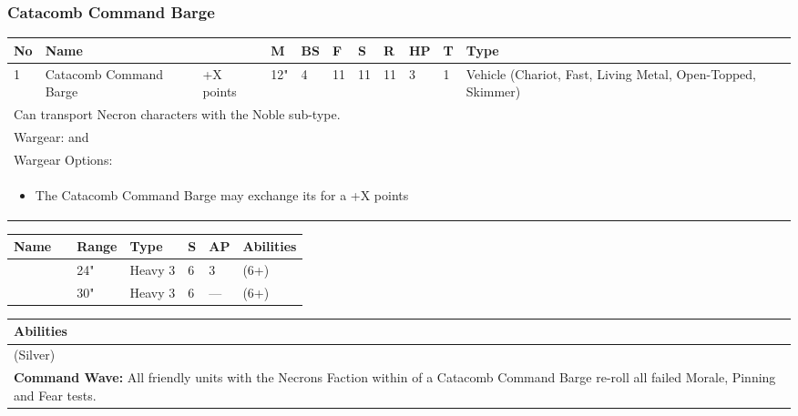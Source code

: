 \newpage
\subsubsection{Catacomb Command Barge}

\noindent
\begin{tabular}{||m{10pt} m{95pt} m{30pt} m{11pt} m{11pt} m{11pt} m{11pt} m{11pt} m{11pt} m{11pt} m{200pt}||}
	\hline
	No & Name & & M & BS & F & S & R & HP & T & Type \\
	\hline
	1 & Catacomb Command Barge & +X points & 12" & 4 & 11 & 11 & 11 & 3 & 1 & Vehicle (Chariot, Fast, Living Metal, Open-Topped, Skimmer) \\
	\hline
	\hline
	\multicolumn{11}{||Z{532 pt}||}{Can transport Necron characters with the Noble sub-type.}\\		
	\hline
	\hline
	\multicolumn{11}{||Z{532 pt}||}{Wargear: \quickref{Gauss Cannon} and \quickref{Quantum Shielding}} \\
	\multicolumn{11}{||Z{532 pt}||}{Wargear Options:} \\	
	\multicolumn{11}{||Z{532 pt}||}{\begin{itemize}
			\item The Catacomb Command Barge may exchange its \quickref{Gauss Cannon} for a \quickref{Tesla Cannon} \hrulefill +X points
	\end{itemize}} \\
	\hline
\end{tabular}

\noindent
\begin{tabular}{||m{110pt} m{30pt} m{31pt} m{55pt} m{12pt} m{12pt} m{210pt}||}
	\hline
	Name & & Range & Type & S & AP & Abilities \\
	\hline
	\quickref{Gauss Cannon} & & 24" & Heavy 3 & 6 & 3 & \quickref{Gauss} (6+) \\
	\quickref{Tesla Cannon} & & 30" & Heavy 3 & 6 & — & \quickref{Tesla} (6+) \\
	\hline
\end{tabular}


\noindent
\begin{tabular}{||m{532pt}||}
	\hline
	Abilities \\
	\hline
	\quickref{Awakening Protocols} (Silver)\\
	\textbf{Command Wave:} All friendly units with the Necrons Faction within \quickref{Nodal Range} of a Catacomb Command Barge re-roll all failed Morale, Pinning and Fear tests.  \\
	\hline
\end{tabular}


